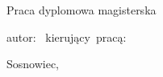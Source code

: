 \pagestyle{empty}
{
    \sffamily
    \rule{0cm}{0cm}

    \begin{center}
    \end{center}
    \vspace{1cm}
    \begin{center}
        \headerfont \unisl
    \end{center}
    \begin{center}
        \headerfont \wydzial
    \end{center}
    \vfill
    \begin{center}
        \titlefont Praca dyplomowa magisterska
    \end{center}
    \vfill

    \begin{center}
        \otherfont \tytul\par
    \end{center}

    \vfill

    \vfill

    \noindent\vbox
    {
        \hbox{\otherfont autor: \autor}
        \vspace{12pt}
        \hbox{\otherfont kierujący pracą: \promotor}
    }
    \vfill

    \begin{center}
        \otherfont Sosnowiec,  \miesiac\ \the\year
    \end{center}
    \restoregeometry
}


\cleardoublepage


\rmfamily
\normalfont